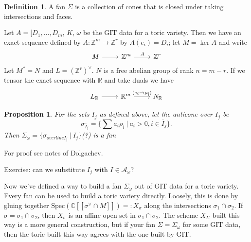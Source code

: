 \documentclass{article}
\newtheorem{prop}[theorem]{Proposition}
\theoremstyle{definition}
\newtheorem{definition}[theorem]{Definition}
\theoremstyle{remark}
\numberwithin{theorem}{section}
\newcommand{\C}{\mathbb{C}}
\newcommand{\Z}{\mathbb{Z}}
\newcommand{\Spec}{\text{Spec}}
\newenvironment{defn}{
	\begin{mdframed}
		\vspace{-0.5em}
		\begin{definition}
		}{
		\end{definition}
	\end{mdframed}
}
\begin{document}
	\begin{defn}
		A fan $\Sigma$ is a collection of cones that is closed under taking intersections and faces.
	\end{defn}
	Let $A=[D_1,...,D_m$, $K$, $\omega$ be the GIT data for a toric variety. Then we have an exact sequence defined by $A:\Z^m \to \Z^r$ by $A(e_i) = D_i$; let $M=\ker A$ and write
	\[\begin{tikzcd}
		M & {\Z^m} & {\Z^r}
		\arrow[from=1-1, to=1-2]
		\arrow["A", from=1-2, to=1-3]
	\end{tikzcd}\]
	Let $M^\ast = N$ and $L=(\Z^r)^\vee$. $N$ is a free abelian group of rank $n=m-r$. If we tensor the exact sequence with $\mathbb{R}$ and take duals we have
	\[\begin{tikzcd}
		{L_\mathbb{R}} & {\mathbb{R}^m} & {N_\mathbb{R}}
		\arrow[from=1-1, to=1-2]
		\arrow["{(e_i\to\rho_i)}", from=1-2, to=1-3]
	\end{tikzcd}\]
	\begin{prop}
		For the sets $I_j$ as defined above, let the anticone over $I_j$ be
		$$\sigma_{\overline{I}_j} = \{\sum a_i \rho_i ~|~ a_i >0, i\in \overline{I}_j\}.$$
		Then $\Sigma_\omega = \{\sigma_{overline{I_j}} ~|~ I_j \}$(?) is a fan
	\end{prop}
	For proof see notes of Dolgachev. \vspace{1em}

	Exercise: can we substitute $\overline{I}_j$ with $I\in\mathcal{A}_\omega$? \vspace*{1em}

	Now we've defined a way to build a fan $\Sigma_\omega$ out of GIT data for a toric variety. Every fan can be used to build a toric variety directly. Loosely, this is done by gluing together $\Spec(\C[[\sigma^\vee\cap M]]) =: X_\sigma$ along the intersections $\sigma_1\cap \sigma_2$. If $\sigma=\sigma_1\cap\sigma_2$, then $X_\sigma$ is an affine open set in $\sigma_1\cap \sigma_2$. The scheme $X_\Sigma$ built this way is a more general construction, but if your fan $\Sigma=\Sigma_\omega$ for some GIT data, then the toric built this way agrees with the one built by GIT. 
\end{document}
